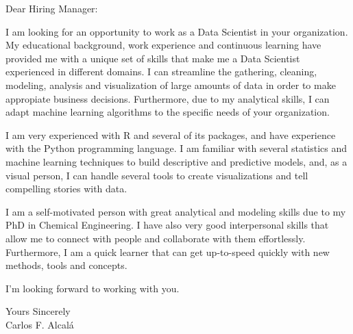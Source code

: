 \documentclass[a4paper,english]{friggeri-letter}
\begin{document}

\address{
   Milwaukee, Wisconsin
}



\opening{Dear Hiring Manager:}

I am looking for an opportunity to work as a Data Scientist in your organization. My educational background, work experience and continuous learning have provided me with a unique set of skills that make me a Data Scientist experienced in different domains. I can streamline the gathering, cleaning, modeling, analysis and visualization of large amounts of data in order to make appropiate business decisions. Furthermore, due to my analytical skills, I can adapt machine learning algorithms to the specific needs of your organization.

I am very experienced with R and several of its packages, and have experience with the Python programming language. I am familiar with several statistics and machine learning techniques to build descriptive and predictive models, and, as a visual person, I can handle several tools to create visualizations and tell compelling stories with data.

I am a self-motivated person with great analytical and modeling skills due to my PhD in Chemical Engineering. I have also very good interpersonal skills that allow me to connect with people and collaborate with them effortlessly. Furthermore, I am a quick learner that can get up-to-speed quickly with new methods, tools and concepts.

I'm looking forward to working with you.

\closing{
  \flushright Yours Sincerely\\
   Carlos F. Alcal\'a}
\end{document}
